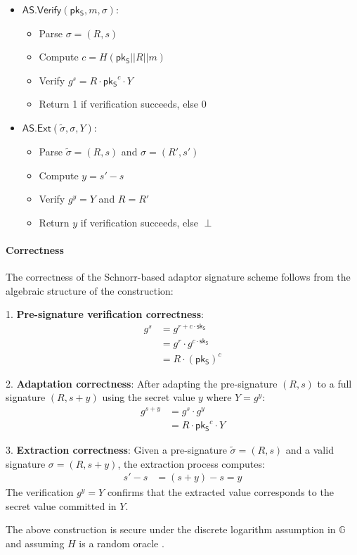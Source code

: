 \begin{itemize}
   \item $\mathsf{AS.Verify}(\mathsf{pk_S}, m, \sigma)$:
       \begin{itemize}
           \item Parse $\sigma = (R,s)$
           \item Compute $c = H(\mathsf{pk_S}||R||m)$
           \item Verify $g^s = R \cdot \mathsf{pk_S}^c \cdot Y$
           \item Return 1 if verification succeeds, else 0
       \end{itemize}
       
   \item $\mathsf{AS.Ext}(\widetilde{\sigma}, \sigma, Y)$:
        \begin{itemize}
            \item Parse $\widetilde{\sigma} = (R,s)$ and $\sigma = (R',s')$
            \item Compute $y = s' - s$
            \item Verify $g^y = Y$ and $R = R'$
            \item Return $y$ if verification succeeds, else $\perp$
        \end{itemize}
\end{itemize}

\paragraph{Correctness} The correctness of the Schnorr-based adaptor signature scheme follows from the algebraic structure of the construction:

1. \textbf{Pre-signature verification correctness}:
   \begin{align*}
   g^s &= g^{r + c \cdot \mathsf{sk_S}} \\
   &= g^r \cdot g^{c \cdot \mathsf{sk_S}} \\
   &= R \cdot (\mathsf{pk_S})^c
   \end{align*}

2. \textbf{Adaptation correctness}:
   After adapting the pre-signature $(R,s)$ to a full signature $(R, s+y)$ using the secret value $y$ where $Y = g^y$:
   \begin{align*}
   g^{s+y} &= g^s \cdot g^y \\
   &= R \cdot \mathsf{pk_S}^c \cdot Y
   \end{align*}

3. \textbf{Extraction correctness}:
   Given a pre-signature $\widetilde{\sigma} = (R,s)$ and a valid signature $\sigma = (R, s+y)$, the extraction process computes:
   \begin{align*}
   s' - s &= (s+y) - s = y
   \end{align*}
   The verification $g^y = Y$ confirms that the extracted value corresponds to the secret value committed in $Y$.

\begin{thm}
The above construction is secure under the discrete logarithm assumption in $\mathbb{G}$ and assuming $H$ is a random oracle \cite{Schnorr91, Lindell17}.
\end{thm}